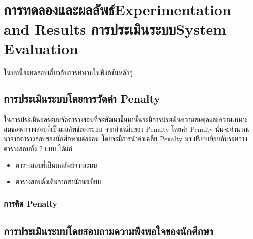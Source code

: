 \chapter{\ifproject%
\ifcpe การทดลองและผลลัพธ์\else Experimentation and Results\fi
\else%
\ifcpe การประเมินระบบ\else System Evaluation\fi
\fi}

ในบทนี้จะทดสอบเกี่ยวกับการทำงานในฟังก์ชันหลักๆ

\section{การประเมินระบบโดยการวัดค่า Penalty}
ในการประเมินผลระบบจัดตารางสอบที่จะพัฒนาขึ้นมานั้นจะมีการประเมินความสมดุลและความเหมาะสมของตารางสอบที่เป็นผลลัพธ์ของระบบ จากค่าเฉลี่ยของ Penalty 
โดยค่า Penalty นั้นจะคำนวณมาจากตารางสอบของนักศึกษาแต่ละคน
โดยจะมีการนำค่าเฉลี่ย Penalty มาเปรียบเทียบกันระหว่างตารางสอบทั้ง 2 แบบ
ได้แก่
\begin{itemize}
    \item ตารางสอบที่เป็นผลลัพธ์จากระบบ
    \item ตารางสอบดั้งเดิมจากสำนักทะเบียน
\end{itemize}

\subsection{การคิด Penalty}

\section{การประเมินระบบโดยสอบถามความพึงพอใจของนักศึกษา}